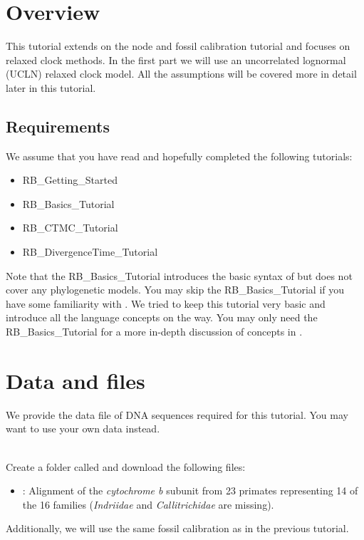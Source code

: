 \section{Overview}

This tutorial extends on the node and fossil calibration tutorial and focuses on relaxed clock methods. 
In the first part we will use an uncorrelated lognormal (UCLN) relaxed clock model.
All the assumptions will be covered more in detail later in this tutorial.

\subsection*{Requirements}
We assume that you have read and hopefully completed the following tutorials:
\begin{itemize}
\item RB\_Getting\_Started
\item RB\_Basics\_Tutorial
\item RB\_CTMC\_Tutorial
\item RB\_DivergenceTime\_Tutorial
\end{itemize}
Note that the RB\_Basics\_Tutorial introduces the basic syntax of \Rev but does not cover any phylogenetic models.
You may skip the RB\_Basics\_Tutorial if you have some familiarity with \R.
We tried to keep this tutorial very basic and introduce all the language concepts on the way.
You may only need the RB\_Basics\_Tutorial for a more in-depth discussion of concepts in \Rev.


\section{Data and files}\label{Sec:data}

We provide the data file of DNA sequences required for this tutorial.
You may want to use your own data instead.

\noindent \\ \impmark Create a folder called  and download the following files:
\begin{itemize}
\item \href{http://rawgit.com/revbayes/revbayes_tutorial/master/RB_DivergenceTimeRelaxedClock_Tutorial/data/primates_cytb.nex}{}: Alignment of the \textit{cytochrome b} subunit from 23 primates representing 14 of the 16 families (\textit{Indriidae} and \textit{Callitrichidae} are missing).
\end{itemize}
Additionally, we will use the same fossil calibration as in the previous tutorial.




